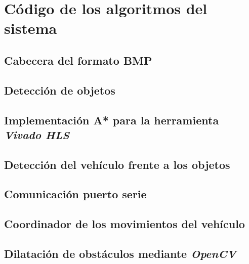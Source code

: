  \chapter{Código de los algoritmos del sistema}\label{anexo:Codigo}
 
 \section{Cabecera del formato \ac{BMP}}

 
 
 \section{Detección de objetos}
  
 

\section{Implementación A* para la herramienta \emph{Vivado HLS}}
 
 

 \section{Detección del vehículo frente a los objetos}
 


\section{Comunicación puerto serie}



\section{Coordinador de los movimientos del vehículo}



\section{Dilatación de obstáculos mediante \emph{OpenCV}}

